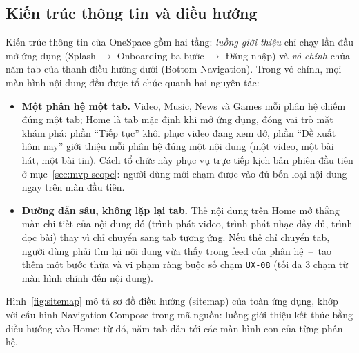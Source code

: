 \subsection{Kiến trúc thông tin và điều hướng}
\label{sec:information-architecture}

Kiến trúc thông tin của OneSpace gồm hai tầng: \textit{luồng giới thiệu} chỉ chạy lần đầu mở ứng dụng (Splash $\rightarrow$ Onboarding ba bước $\rightarrow$ Đăng nhập) và \textit{vỏ chính} chứa năm tab của thanh điều hướng dưới (Bottom Navigation). Trong vỏ chính, mọi màn hình nội dung đều được tổ chức quanh hai nguyên tắc:

\begin{itemize}
    \item \textbf{Một phân hệ một tab.} Video, Music, News và Games mỗi phân hệ chiếm đúng một tab; Home là tab mặc định khi mở ứng dụng, đóng vai trò mặt khám phá: phần ``Tiếp tục'' khôi phục video đang xem dở, phần ``Đề xuất hôm nay'' giới thiệu mỗi phân hệ đúng một nội dung (một video, một bài hát, một bài tin). Cách tổ chức này phục vụ trực tiếp kịch bản phiên đầu tiên ở mục~\ref{sec:mvp-scope}: người dùng mới chạm được vào đủ bốn loại nội dung ngay trên màn đầu tiên.
    \item \textbf{Đường dẫn sâu, không lặp lại tab.} Thẻ nội dung trên Home mở thẳng màn chi tiết của nội dung đó (trình phát video, trình phát nhạc đầy đủ, trình đọc bài) thay vì chỉ chuyển sang tab tương ứng. Nếu thẻ chỉ chuyển tab, người dùng phải tìm lại nội dung vừa thấy trong feed của phân hệ~--~tạo thêm một bước thừa và vi phạm ràng buộc số chạm \texttt{UX-08} (tối đa 3 chạm từ màn hình chính đến nội dung).
\end{itemize}

Hình~\ref{fig:sitemap} mô tả sơ đồ điều hướng (sitemap) của toàn ứng dụng, khớp với cấu hình Navigation Compose trong mã nguồn: luồng giới thiệu kết thúc bằng điều hướng vào Home; từ đó, năm tab dẫn tới các màn hình con của từng phân hệ.

